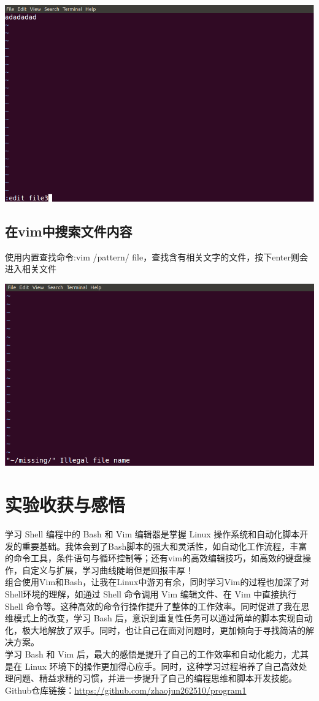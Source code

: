 \documentclass[UTF8,a4paper]{ctexart}
\begin{document}
\begin{sloppypar}
	\includegraphics[width = 16cm]{191}
	
	\subsection{在vim中搜索文件内容}
	使用内置查找命令:vim /pattern/ file，查找含有相关文字的文件，按下enter则会进入相关文件
	
	\includegraphics[width = 16cm]{201}

	\section{实验收获与感悟}
	学习 Shell 编程中的 Bash 和 Vim 编辑器是掌握 Linux 操作系统和自动化脚本开发的重要基础。我体会到了Bash脚本的强大和灵活性，如自动化工作流程，丰富的命令工具，条件语句与循环控制等；还有vim的高效编辑技巧，如高效的键盘操作，自定义与扩展，学习曲线陡峭但是回报丰厚！\\
	\indent 组合使用Vim和Bash，让我在Linux中游刃有余，同时学习Vim的过程也加深了对Shell环境的理解，如通过 Shell 命令调用 Vim 编辑文件、在 Vim 中直接执行 Shell 命令等。这种高效的命令行操作提升了整体的工作效率。同时促进了我在思维模式上的改变，学习 Bash 后，意识到重复性任务可以通过简单的脚本实现自动化，极大地解放了双手。同时，也让自己在面对问题时，更加倾向于寻找简洁的解决方案。\\
	\indent 学习 Bash 和 Vim 后，最大的感悟是提升了自己的工作效率和自动化能力，尤其是在 Linux 环境下的操作更加得心应手。同时，这种学习过程培养了自己高效处理问题、精益求精的习惯，并进一步提升了自己的编程思维和脚本开发技能。\\
	
	Github仓库链接：\url{https://github.com/zhaojun262510/program1}
	
\end{sloppypar}
\end{document}
